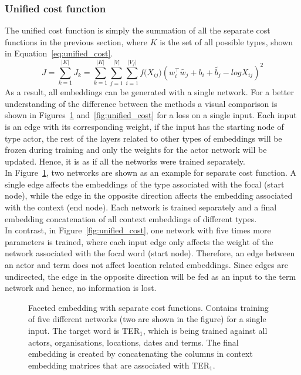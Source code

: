 \subsubsection{Unified cost function  }
\label{sec:unified_cost}
The unified cost function is simply the summation of all the separate cost functions in the previous section, where $K$ is the set of all possible types, shown in Equation~\ref{eq:unified_cost}.
\begin{equation}
J=\sum _{ k=1 }^{ |K| }{J_k}=\sum _{ k=1 }^{ |K| }{}\sum _{ j=1 }^{ |V| }{}\sum _{ i=1 }^{ |V_f| }{ f({ X }_{ ij } } )(w_{ i }^{ \top }\tilde{  w_{ j } } +b_{ i }+\tilde{  b_{ j } } -log{ X }_{ ij })^2
\label{eq:unified_cost}
\end{equation}
As a result, all embeddings can be generated with a single network. For a better understanding of the difference between the methods a visual comparison is shown in Figures~\ref{fig:separate_cost} and~\ref{fig:unified_cost} for a loss on a single input. Each input is an edge with its corresponding weight, if the input has the starting node of type actor, the rest of the layers related to other types of embeddings will be frozen during training and only the weights for the actor network will be updated. Hence, it is as if all the networks were trained separately.  \\
In Figure~\ref{fig:separate_cost}, two networks are shown as an example for separate cost function. A single edge affects the embeddings of the type associated with the focal (start node), while the edge in the opposite direction affects the embedding associated with the context (end node). Each network is trained separately and a final embedding concatenation of all context embeddings of different types. \\
In contrast, in Figure~\ref{fig:unified_cost}, one network with five times more parameters is trained, where each input edge only affects the weight of the network associated with the focal word (start node). Therefore, an edge between an actor and term does not affect location related embeddings. Since edges are undirected, the edge in the opposite direction will be fed as an input to the term network and hence, no information is lost. 
\begin{figure}
{\small 
{} %

}
\caption{Faceted embedding with separate cost functions. Contains training of five different networks (two are shown in the figure) for a single input. The target word is TER$_1$, which is being trained against all actors, organisations, locations, dates and terms. The final embedding is created by concatenating the columns in context embedding matrices that are associated with TER$_1$.} \label{fig:separate_cost}
\end{figure}
